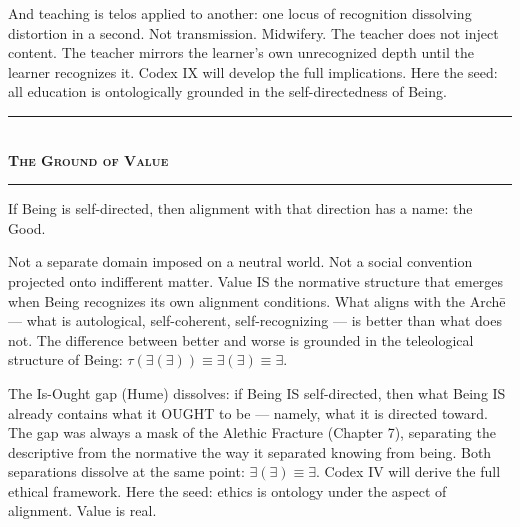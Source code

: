 \documentclass[10pt, openany, oneside]{book}
\renewcommand{\normalsize}{\fontsize{10}{13}\selectfont}
\begin{document}
And teaching is telos applied to another: one locus of recognition dissolving distortion in a second. Not transmission. Midwifery. The teacher does not inject content. The teacher mirrors the learner's own unrecognized depth until the learner recognizes it. Codex IX will develop the full implications. Here the seed: all education is ontologically grounded in the self-directedness of Being.

\vspace{1.5em}


\begin{center}
    \rule{0.3\textwidth}{0.4pt}\\[0.5em]
    {\normalsize\bfseries\scshape The Ground of Value}\\[0.3em]
    \rule{0.3\textwidth}{0.4pt}
\end{center}

\vspace{1em}

\noindent If Being is self-directed, then alignment with that direction has a name: the Good.

Not a separate domain imposed on a neutral world. Not a social convention projected onto indifferent matter. Value IS the normative structure that emerges when Being recognizes its own alignment conditions. What aligns with the Arch\={e} --- what is autological, self-coherent, self-recognizing --- is better than what does not. The difference between better and worse is grounded in the teleological structure of Being: $\tau(\exists(\exists)) \equiv \exists(\exists) \equiv \exists$.

The Is-Ought gap (Hume) dissolves: if Being IS self-directed, then what Being IS already contains what it OUGHT to be --- namely, what it is directed toward. The gap was always a mask of the Alethic Fracture (Chapter 7), separating the descriptive from the normative the way it separated knowing from being. Both separations dissolve at the same point: $\exists(\exists) \equiv \exists$. Codex IV will derive the full ethical framework. Here the seed: ethics is ontology under the aspect of alignment. Value is real.
\end{document}
